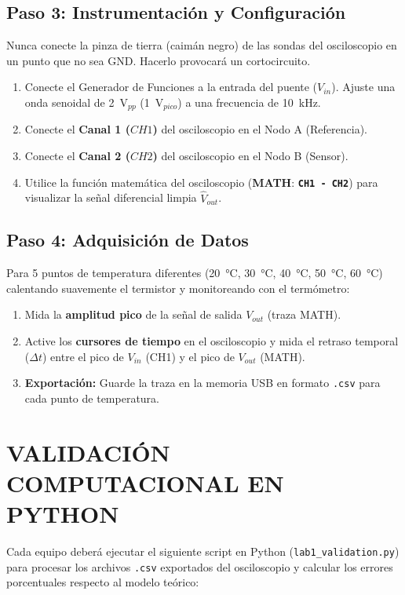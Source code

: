\documentclass[11pt,a4paper]{article}
\newcommand{\tecla}[1]{\colorbox{gray!20}{\texttt{\footnotesize\textbf{#1}}}}
\newcommand{\menu}[1]{\textbf{\textsf{#1}}}
\begin{document}
\subsection*{Paso 3: Instrumentación y Configuración}
\begin{warning}
Nunca conecte la pinza de tierra (caimán negro) de las sondas del osciloscopio en un punto que no sea GND. Hacerlo provocará un cortocircuito.
\end{warning}
\begin{enumerate}
    \item Conecte el Generador de Funciones a la entrada del puente ($V_{in}$). Ajuste una onda senoidal de \qty{2}{\volt}$_{pp}$ (\qty{1}{\volt}$_{pico}$) a una frecuencia de \qty{10}{\kilo\hertz}.
    \item Conecte el \textbf{Canal 1 ($CH1$)} del osciloscopio en el Nodo A (Referencia).
    \item Conecte el \textbf{Canal 2 ($CH2$)} del osciloscopio en el Nodo B (Sensor).
    \item Utilice la función matemática del osciloscopio (\menu{MATH}: \tecla{CH1 - CH2}) para visualizar la señal diferencial limpia $\hat{V}_{out}$.
\end{enumerate}

\subsection*{Paso 4: Adquisición de Datos}
Para 5 puntos de temperatura diferentes (\qty{20}{\celsius}, \qty{30}{\celsius}, \qty{40}{\celsius}, \qty{50}{\celsius}, \qty{60}{\celsius}) calentando suavemente el termistor y monitoreando con el termómetro:
\begin{enumerate}
    \item Mida la \textbf{amplitud pico} de la señal de salida $V_{out}$ (traza MATH).
    \item Active los \textbf{cursores de tiempo} en el osciloscopio y mida el retraso temporal ($\Delta t$) entre el pico de $V_{in}$ (CH1) y el pico de $V_{out}$ (MATH).
    \item \textbf{Exportación:} Guarde la traza en la memoria USB en formato \texttt{.csv} para cada punto de temperatura.
\end{enumerate}

\newpage
\section{VALIDACIÓN COMPUTACIONAL EN PYTHON}
Cada equipo deberá ejecutar el siguiente script en Python (\texttt{lab1\_validation.py}) para procesar los archivos \texttt{.csv} exportados del osciloscopio y calcular los errores porcentuales respecto al modelo teórico:
\end{document}

